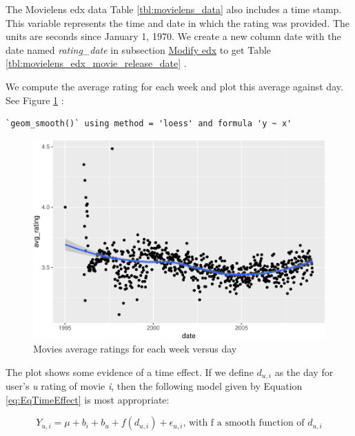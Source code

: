 \documentclass[
]{article}
\begin{document}
The Movielens edx data Table \ref{tbl:movielens_data} also includes a
time stamp. This variable represents the time and date in which the
rating was provided. The units are seconds since January 1, 1970. We
create a new column date with the date named \emph{rating\_date} in
subsection \protect\hyperlink{modify_edx}{Modify edx} to get Table
\ref{tbl:movielens_edx_movie_release_date} .

We compute the average rating for each week and plot this average
against day. See Figure
\ref{fig:movies_average_ratings_for_each_week_versus_day} :

\begin{verbatim}
`geom_smooth()` using method = 'loess' and formula 'y ~ x'
\end{verbatim}

\begin{figure}
\centering
\includegraphics{figures/rd_1-1.pdf}
\caption{Movies average ratings for each week versus
day\label{fig:movies_average_ratings_for_each_week_versus_day}}
\end{figure}

The plot shows some evidence of a time effect. If we define \(d_{u,i}\)
as the day for user's \emph{u} rating of movie \emph{i}, then the
following model given by Equation \ref{eq:EqTimeEffect} is most
appropriate:

%
\par

\label{eq:EqTimeEffect} \begin{equation}
Y_{u,i} = \mu + b_{i} + b_{u}  + f(d_{u,i})+ \epsilon_{u,i}\text{, with f a smooth function of }d_{u,i}
\end{equation}
\end{document}
